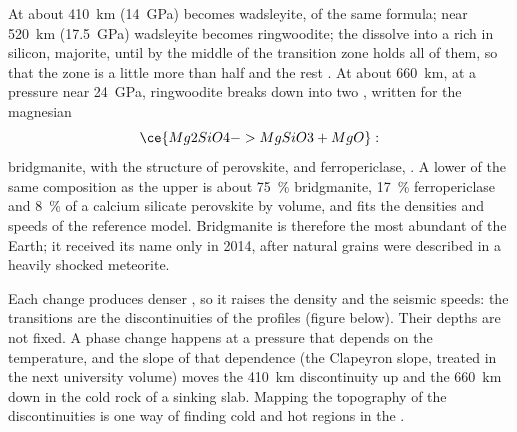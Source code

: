 At about \qty{410}{km} (\qty{14}{GPa})   becomes
wadsleyite, of the same formula; near \qty{520}{km} (\qty{17.5}{GPa}) wadsleyite
becomes ringwoodite; the  dissolve into a  rich in silicon,
majorite, until by the middle of the transition zone  holds all of them,
so that the zone is a little more than half   and the rest
. At about \qty{660}{km}, at a pressure near \qty{24}{GPa}, ringwoodite
breaks down into
two , written for the magnesian 
\[
  \ce{Mg2SiO4 -> MgSiO3 + MgO}:
\]
bridgmanite,  with the structure of perovskite, and
ferropericlase, . A lower  of the same composition as the
upper  is about \qty{75}{\percent} bridgmanite, \qty{17}{\percent}
ferropericlase and \qty{8}{\percent} of a calcium silicate perovskite by
volume, and fits the densities and speeds of the reference model. Bridgmanite
is therefore the most abundant  of the Earth; it received its name only
in 2014, after natural grains were described in a heavily shocked meteorite.

Each change produces denser , so it raises the density and the
seismic speeds: the transitions are the discontinuities of the profiles
(figure below). Their
depths are not fixed. A phase change happens at a pressure that depends on the
temperature, and the slope of that dependence (the Clapeyron slope, treated in
the next university volume) moves the \qty{410}{km} discontinuity up and the
\qty{660}{km} down in the cold rock of a sinking slab. Mapping the topography of
the discontinuities is one way of finding cold and hot regions in the .

